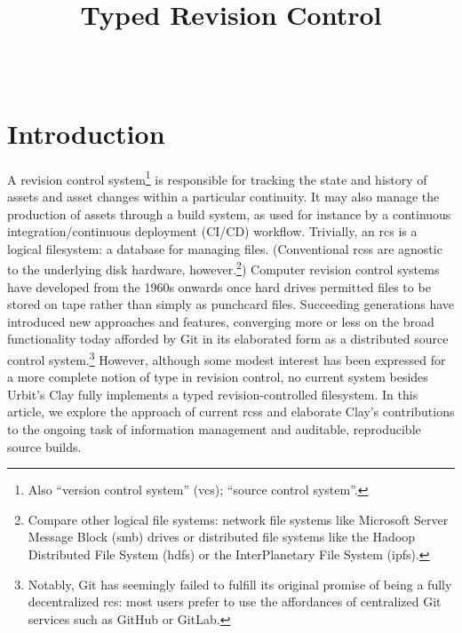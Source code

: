 \documentclass[twoside]{article}
\title{Typed Revision Control}
\author{\authorname~\authorpatp \\ \affiliation}
\date{}
\begin{document}
\maketitle
\thispagestyle{firststyle}

\begin{abstract}
  
\end{abstract}

\setcounter{page}{1}

\tableofcontents

\section{Introduction}

A revision control system\footnote{Also “version control system” ({\sc vcs}); “source control system”.} is responsible for tracking the state and history of assets and asset changes within a particular continuity.  It may also manage the production of assets through a build system, as used for instance by a continuous integration/continuous deployment (CI/CD) workflow.  Trivially, an {\sc rcs} is a logical filesystem:  a database for managing files.  (Conventional {\sc rcs}s are agnostic to the underlying disk hardware, however.\footnote{Compare other logical file systems:  network file systems like Microsoft Server Message Block ({\sc smb}) drives or distributed file systems like the Hadoop Distributed File System ({\sc hdfs}) or the InterPlanetary File System ({\sc ipfs}).})  Computer revision control systems have developed from the 1960s onwards once hard drives permitted files to be stored on tape rather than simply as punchcard files.  Succeeding generations have introduced new approaches and features, converging more or less on the broad functionality today afforded by Git \citep{Torvalds2005} in its elaborated form as a distributed source control system.\footnote{Notably, Git has seemingly failed to fulfill its original promise of being a fully decentralized {\sc rcs}:  most users prefer to use the affordances of centralized Git services such as GitHub or GitLab.}  However, although some modest interest has been expressed for a more complete notion of type in revision control, no current system besides Urbit's Clay fully implements a typed revision-controlled filesystem.  In this article, we explore the approach of current {\sc rcs}s and elaborate Clay's contributions to the ongoing task of information management and auditable, reproducible source builds.
\end{document}
